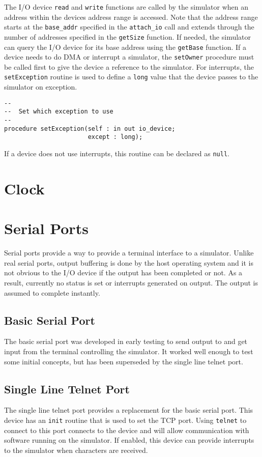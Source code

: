 \documentclass[10pt, openany]{book}
\begin{document}
The I/O device \verb|read| and \verb|write| functions are called by the simulator when an address within the devices address range is accessed.  Note that the address range starts at the \verb|base_addr| specified in the \verb|attach_io| call and extends through the number of addresses specified in the \verb|getSize| function.  If needed, the simulator can query the I/O device for its base address using the \verb|getBase| function.  If a device needs to do DMA or interrupt a simulator, the \verb|setOwner| procedure must be called first to give the device a reference to the simulator.  For interrupts, the \verb|setException| routine is used to define a \verb|long| value that the device passes to the simulator on exception.
\begin{lstlisting}
--
--  Set which exception to use
--
procedure setException(self : in out io_device;
                       except : long);
\end{lstlisting}

If a device does not use interrupts, this routine can be declared as \verb|null|.

\section{Clock}
\section{Serial Ports}
Serial ports provide a way to provide a terminal interface to a simulator.  Unlike real serial ports, output buffering is done by the host operating system and it is not obvious to the I/O device if the output has been completed or not.  As a result, currently no status is set or interrupts generated on output.  The output is assumed to complete instantly.

\subsection{Basic Serial Port}
The basic serial port was developed in early testing to send output to and get input from the terminal controlling the simulator.  It worked well enough to test some initial concepts, but has been superseded by the single line telnet port.
\subsection{Single Line Telnet Port}
The single line telnet port provides a replacement for the basic serial port.  This device has an \verb|init| routine that is used to set the TCP port.  Using \verb|telnet| to connect to this port connects to the device and will allow communication with software running on the simulator.  If enabled, this device can provide interrupts to the simulator when characters are received.
\end{document}
